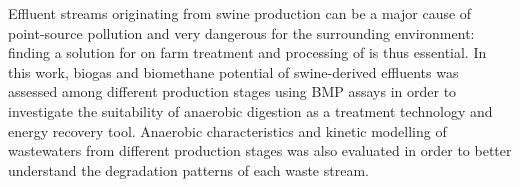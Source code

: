 Effluent streams originating from swine production can be a major cause of point-source pollution and very dangerous for the surrounding environment: finding a solution for on farm treatment and processing of  is thus essential. In this work, biogas and biomethane potential of swine-derived effluents was assessed among different production stages using BMP assays in order to investigate the suitability of anaerobic digestion as a treatment technology and energy recovery tool. Anaerobic characteristics and kinetic modelling of wastewaters from different production stages was also evaluated in order to better understand the degradation patterns of each waste stream.